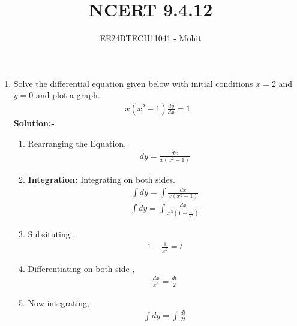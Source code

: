 \documentclass[journal]{IEEEtran}
\begin{document}

\vspace{3cm}

\title{NCERT 9.4.12}
\author{EE24BTECH11041 - Mohit}
{\let\newpage\relax\maketitle}

\renewcommand{\thefigure}{\theenumi}
\renewcommand{\thetable}{\theenumi}
\setlength{\intextsep}{10pt} %
\begin{enumerate}
\item Solve the differential equation given below with initial conditions $ x = 2 $ and $ y = 0 $ and plot a graph.
\begin{align}
	x(x^2-1)\frac{dy}{dx}=1
\end{align}
\textbf{Solution:-}\\
\begin{enumerate}
    \item Rearranging the Equation,\\
    \begin{align}
	    dy = \frac{dx}{x(x^2-1)}
    \end{align}
    \item \textbf{Integration:} Integrating on both sides.\\   
    \begin{align}
    \int{dy} = \int{\frac{dx}{x(x^2-1)}} 
    \end{align}
    \begin{align}
    \int{dy} = \int{\frac{dx}{x^3(1-\frac{1}{x^2})}} 
    \end{align}
    \item Subsituting ,
    \begin{align}
    1-\frac{1}{x^2} = t
    \end{align}
    \item Differentiating on both side ,
    \begin{align}
    \frac{dx}{x^3}=\frac{dt}{2}
    \end{align}
    \item  Now integrating,
    \begin{align}
    \int{dy} = \int{\frac{dt}{2t}} 
    \end{align}
    \begin{align}

\end{align}
\end{enumerate}
\end{enumerate}
\end{document}
